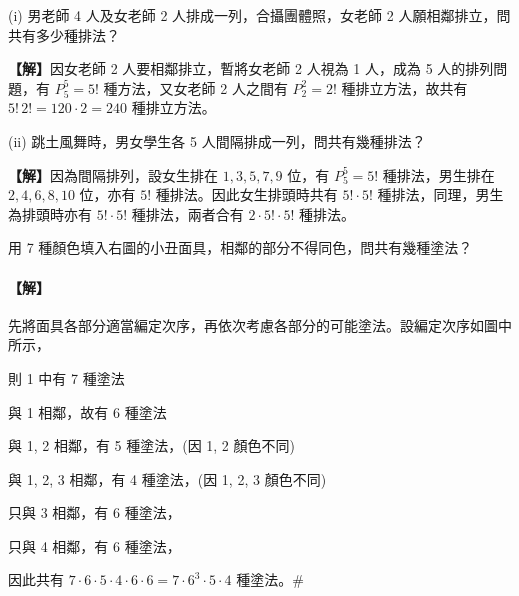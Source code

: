\vspace{1em}
\begin{example}\label{ex:b5-2-11}
(i) 男老師 4 人及女老師 2 人排成一列，合攝團體照，女老師 2 人願相鄰排立，問共有多少種排法？
\par\smallskip\noindent\textbf{【解】}\quad 因女老師 2 人要相鄰排立，暫將女老師 2 人視為 1 人，成為 5 人的排列問題，有 $P_5^5 = 5!$ 種方法，又女老師 2 人之間有 $P_2^2 = 2!$ 種排立方法，故共有 $5! \, 2! = 120 \cdot 2 = 240$ 種排立方法。

\indent(ii) 跳土風舞時，男女學生各 5 人間隔排成一列，問共有幾種排法？
\par\smallskip\noindent\textbf{【解】}\quad 因為間隔排列，設女生排在 $1, 3, 5, 7, 9$ 位，有 $P_5^5 = 5!$ 種排法，男生排在 $2, 4, 6, 8, 10$ 位，亦有 $5!$ 種排法。因此女生排頭時共有 $5! \cdot 5!$ 種排法，同理，男生為排頭時亦有 $5! \cdot 5!$ 種排法，兩者合有 $2 \cdot 5! \cdot 5!$ 種排法。
\end{example}

\vspace{1em}
\noindent
\begin{minipage}[t]{0.66\textwidth}
\begin{discussion}\label{disc:b5-2-4}
用 7 種顏色填入右圖的小丑面具，相鄰的部分不得同色，問共有幾種塗法？
\end{discussion}
\paragraph{【解】}
先將面具各部分適當編定次序，再依次考慮各部分的可能塗法。設編定次序如圖中所示，

\indent 則 1 中有 7 種塗法

 與 1 相鄰，故有 6 種塗法

 與 1, 2 相鄰，有 5 種塗法，(因 1, 2 顏色不同)

 與 1, 2, 3 相鄰，有 4 種塗法，(因 1, 2, 3 顏色不同)

 只與 3 相鄰，有 6 種塗法，

 只與 4 相鄰，有 6 種塗法，

因此共有 $7 \cdot 6 \cdot 5 \cdot 4 \cdot 6 \cdot 6 = 7 \cdot 6^3 \cdot 5 \cdot 4$ 種塗法。\hfill\#
\end{minipage}\hfill
\begin{minipage}[t]{0.32\textwidth}
\centering
\vspace{1em}
\end{minipage}

